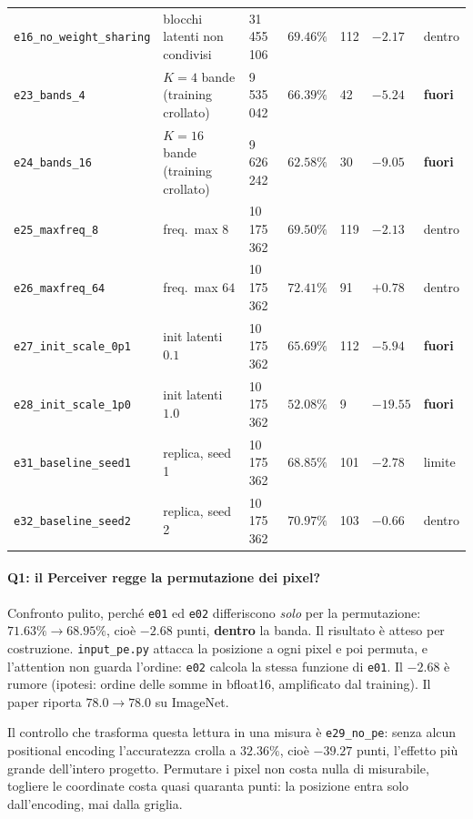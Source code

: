 \documentclass[
  11pt,
]{article}
\begin{document}
\begin{center}
{\begin{tabular}{@{}p{3.1cm}p{3.3cm}p{1.5cm}p{1.2cm}p{0.7cm}p{1.0cm}p{0.9cm}@{}}
\texttt{e16\_no\_weight\_sharing} & blocchi latenti non condivisi & 31\,455\,106 & $69.46\%$ & 112 & $-2.17$ & dentro \\
\texttt{e23\_bands\_4} & $K{=}4$ bande (training crollato) & 9\,535\,042 & $66.39\%$ & 42 & $-5.24$ & \textbf{fuori} \\
\texttt{e24\_bands\_16} & $K{=}16$ bande (training crollato) & 9\,626\,242 & $62.58\%$ & 30 & $-9.05$ & \textbf{fuori} \\
\texttt{e25\_maxfreq\_8} & freq.\ max $8$ & 10\,175\,362 & $69.50\%$ & 119 & $-2.13$ & dentro \\
\texttt{e26\_maxfreq\_64} & freq.\ max $64$ & 10\,175\,362 & $72.41\%$ & 91 & $+0.78$ & dentro \\
\texttt{e27\_init\_scale\_0p1} & init latenti $0.1$ & 10\,175\,362 & $65.69\%$ & 112 & $-5.94$ & \textbf{fuori} \\
\texttt{e28\_init\_scale\_1p0} & init latenti $1.0$ & 10\,175\,362 & $52.08\%$ & 9 & $-19.55$ & \textbf{fuori} \\
\texttt{e31\_baseline\_seed1} & replica, seed 1 & 10\,175\,362 & $68.85\%$ & 101 & $-2.78$ & limite \\
\texttt{e32\_baseline\_seed2} & replica, seed 2 & 10\,175\,362 & $70.97\%$ & 103 & $-0.66$ & dentro \\
\bottomrule
\end{tabular}
}
\end{center}

\paragraph{Q1: il Perceiver regge la permutazione dei pixel?}
Confronto pulito, perché \texttt{e01} ed \texttt{e02} differiscono \emph{solo} per la permutazione: $71.63\% \to 68.95\%$, cioè $-2.68$ punti, \textbf{dentro} la banda. Il risultato è atteso per costruzione. \texttt{input\_pe.py} attacca la posizione a ogni pixel e poi permuta, e l'attention non guarda l'ordine: \texttt{e02} calcola la stessa funzione di \texttt{e01}. Il $-2.68$ è rumore (ipotesi: ordine delle somme in bfloat16, amplificato dal training). Il paper riporta $78.0 \to 78.0$ su ImageNet.

Il controllo che trasforma questa lettura in una misura è \texttt{e29\_no\_pe}: senza alcun positional encoding l'accuratezza crolla a $32.36\%$, cioè $\mathbf{-39.27}$ punti, l'effetto più grande dell'intero progetto. Permutare i pixel non costa nulla di misurabile, togliere le coordinate costa quasi quaranta punti: la posizione entra solo dall'encoding, mai dalla griglia.
\end{document}
